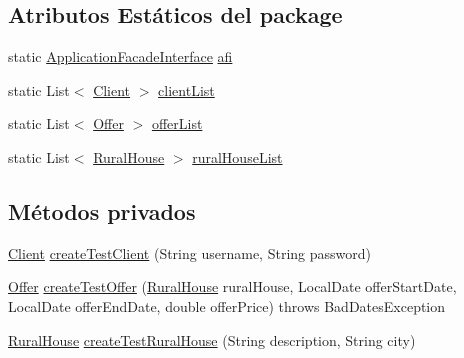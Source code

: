 \subsection*{Atributos Estáticos del \textquotesingle{}package\textquotesingle{}}
\begin{DoxyCompactItemize}
\item 
static \mbox{\hyperlink{interfacecom_1_1ruralhousejsf_1_1business_logic_1_1_application_facade_interface}{Application\+Facade\+Interface}} \mbox{\hyperlink{classcom_1_1ruralhousejsf_1_1_equals_test_a51e738cac64499dfd6d290d8f70ec8ce}{afi}}
\item 
static List$<$ \mbox{\hyperlink{classcom_1_1ruralhousejsf_1_1domain_1_1_client}{Client}} $>$ \mbox{\hyperlink{classcom_1_1ruralhousejsf_1_1_equals_test_a313faa108d9cc5b97c40bf50af089c87}{client\+List}}
\item 
static List$<$ \mbox{\hyperlink{classcom_1_1ruralhousejsf_1_1domain_1_1_offer}{Offer}} $>$ \mbox{\hyperlink{classcom_1_1ruralhousejsf_1_1_equals_test_abf5b3398125f0ed991c84afb429512f4}{offer\+List}}
\item 
static List$<$ \mbox{\hyperlink{classcom_1_1ruralhousejsf_1_1domain_1_1_rural_house}{Rural\+House}} $>$ \mbox{\hyperlink{classcom_1_1ruralhousejsf_1_1_equals_test_a9bdc3ab9b2c103383f6c34f253fe8307}{rural\+House\+List}}
\end{DoxyCompactItemize}
\subsection*{Métodos privados}
\begin{DoxyCompactItemize}
\item 
\mbox{\hyperlink{classcom_1_1ruralhousejsf_1_1domain_1_1_client}{Client}} \mbox{\hyperlink{classcom_1_1ruralhousejsf_1_1_equals_test_a08081415d14d86f7b8a63fe7270546dc}{create\+Test\+Client}} (String username, String password)
\item 
\mbox{\hyperlink{classcom_1_1ruralhousejsf_1_1domain_1_1_offer}{Offer}} \mbox{\hyperlink{classcom_1_1ruralhousejsf_1_1_equals_test_a322f0b87565b40ecb1d9d0e6246ebaa0}{create\+Test\+Offer}} (\mbox{\hyperlink{classcom_1_1ruralhousejsf_1_1domain_1_1_rural_house}{Rural\+House}} rural\+House, Local\+Date offer\+Start\+Date, Local\+Date offer\+End\+Date, double offer\+Price)  throws Bad\+Dates\+Exception 
\item 
\mbox{\hyperlink{classcom_1_1ruralhousejsf_1_1domain_1_1_rural_house}{Rural\+House}} \mbox{\hyperlink{classcom_1_1ruralhousejsf_1_1_equals_test_aaee652d5b230a23c765bd95b9691056b}{create\+Test\+Rural\+House}} (String description, String city)
\end{DoxyCompactItemize}
